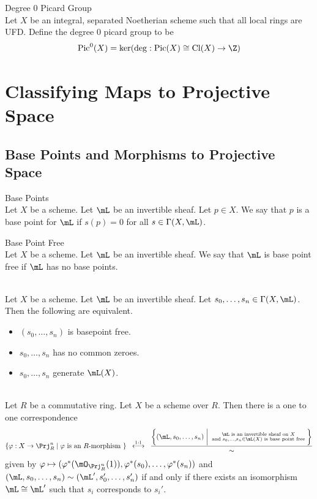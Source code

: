 \documentclass[a4paper]{article}
\begin{document}
\begin{defn}{Degree $0$ Picard Group}{}\\
Let $X$ be an integral, separated Noetherian scheme such that all local rings are UFD. Define the degree $0$ picard group to be $$\text{Pic}^0(X)=\ker(\deg:\text{Pic}(X)\cong\text{Cl}(X)\to\Z)$$
\end{defn}


\pagebreak
\section{Classifying Maps to Projective Space}
\subsection{Base Points and Morphisms to Projective Space}
\begin{defn}{Base Points}{}\\
Let $X$ be a scheme. Let $\mL$ be an invertible sheaf. Let $p\in X$. We say that $p$ is a base point for $\mL$ if $s(p)=0$ for all $s\in\Gamma(X,\mL)$. 
\end{defn}

\begin{defn}{Base Point Free}{}\\
Let $X$ be a scheme. Let $\mL$ be an invertible sheaf. We say that $\mL$ is base point free if $\mL$ has no base points. 
\end{defn}

\begin{lmm}{}{}\\
Let $X$ be a scheme. Let $\mL$ be an invertible sheaf. Let $s_0,\dots,s_n\in\Gamma(X,\mL)$. Then the following are equivalent. 
\begin{itemize}
\item $(s_0,\dots,s_n)$ is basepoint free. 
\item $s_0,\dots,s_n$ has no common zeroes. 
\item $s_0,\dots,s_n$ generate $\mL(X)$. 
\end{itemize}
\end{lmm}

\begin{prp}{}{}\\
Let $R$ be a commutative ring. Let $X$ be a scheme over $R$. Then there is a one to one correspondence $$\{\varphi:X\to\Prj_R^n\;|\;\varphi\text{ is an }R\text{-morphism }\}\;\;\overset{1:1}{\longleftrightarrow}\;\;\frac{\left\{(\mL,s_0,\dots,s_n)\;\bigg{|}\;\substack{\mL\text{ is an invertible sheaf on }X\\\text{ and }s_0,\dots,s_n\in\mL(X)\text{ is base point free }}\right\}}{\sim}$$ given by $\varphi\mapsto(\varphi^\ast(\mO_{\Prj_R^n}(1)),\varphi^\ast(s_0),\dots,\varphi^\ast(s_n))$ and $(\mL,s_0,\dots,s_n)\sim(\mL',s_0',\dots,s_n')$ if and only if there exists an isomorphism $\mL\cong\mL'$ such that $s_i$ corresponds to $s_i'$. 
\end{prp}
\end{document}
